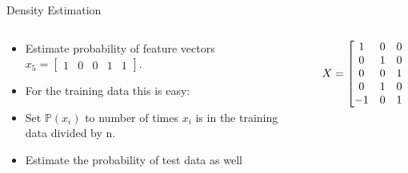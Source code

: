 \documentclass[11pt,aspectratio=1610,usenames,dvipsnames]{beamer} %
\begin{document}
\begin{frame}{Density Estimation}

\begin{columns}
	\begin{column}{0.49\textwidth}
			\begin{itemize}
				\item Estimate probability of feature vectors $ x_{5}= \begin{bmatrix}1 & 0 &0 &1 & 1\end{bmatrix}$.
				\item For the training data this is easy:
				\item Set $ \mathbb{P}(x_{i}) $ to number of times $ x_{i} $ is in the training data divided by n.
				\item Estimate the probability of test data as well
			\end{itemize}
	\end{column}
	~
	\begin{column}{0.49\textwidth}
		
			\begin{align*}
				X &= \begin{bmatrix}
							1 & 0 & 0 & 0 \\
							0 & 1 & 0 & 0 \\ 
							0 & 0 & 1 & 0 \\
							0 & 1 & 0 & 1 \\
						\DoTikzmark{num-2}{-}	1 & 0 & 1 & 1\DoTikzmark{num1}
						\end{bmatrix}
				\end{align*}
		
	\end{column}
	
\end{columns}
\end{frame}
\end{document}
